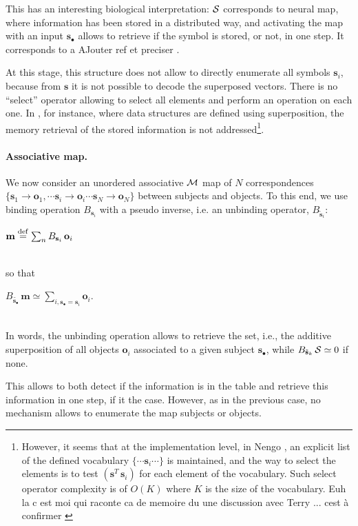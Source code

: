 \documentclass[a4]{article}
\newcommand{\vthierry}[2]{{\color{magenta} #1} \sout{#2}}
\newcommand{\deq}{\stackrel {\rm def}{=}}
\newcommand{\eqline}[1]{~\vspace{0.1cm}\\\centerline{$#1$}\vspace{0.1cm}\\}
\begin{document}
This has an interesting biological interpretation: ${\cal S}$ corresponds to neural map, where information has been stored in a distributed way, and activating the map with an input $\mathbf{s}_\bullet$ allows to retrieve if the symbol is stored, or not, in one step. It corresponds to a \vthierry{AJouter ref et preciser}{}.

At this stage, this structure does not allow to directly enumerate all symbols $\mathbf{s}_i$, because from $\mathbf{s}$ it is not possible to decode the superposed vectors. There is no ``select'' operator allowing to select all elements and perform an operation on each one. In \cite{crawford_biologically_2016}, for instance, where data structures are defined using superposition, the memory retrieval of the stored information is not addressed\footnote{However, it seems that at the implementation level, in Nengo \cite{eliasmith_how_2013}, an explicit list of the defined vocabulary $\{\cdots \mathbf{s}_i \cdots\}$ is maintained, and the way to select the elements is to test $(\mathbf{s}^T \, \mathbf{s}_i)$ for each element of the vocabulary. Such select operator complexity is of $O(K)$ where $K$ is the size of the vocabulary. \vthierry{Euh la c est moi qui raconte ca de memoire du une discussion avec Terry ... cest à confirmer}{}}.

\paragraph{Associative map.} We now consider an unordered associative ${\cal M}$ map of $N$ correspondences $\{\mathbf{s}_1 \rightarrow \mathbf{o}_1, \cdots \mathbf{s}_i \rightarrow \mathbf{o}_i \cdots \mathbf{s}_N \rightarrow \mathbf{o}_N\}$ between subjects and objects. To this end, we use binding operation $B_{\mathbf{s}_i}$ with a pseudo inverse, i.e. an unbinding operator, $B_{\tilde{\mathbf{s}}_i}$:
\eqline{\mathbf{m} \deq \sum_n B_{\mathbf{s}_i} \, \mathbf{o}_i}
so that 
\eqline{B_{\tilde{{\mathbf{s}}_\bullet}} \, \mathbf{m} \simeq \sum_{i, \mathbf{s}_\bullet = \mathbf{s}_i} \mathbf{o}_i.}
In words, the unbinding operation allows to retrieve the set, i.e., the additive superposition of all objects $\mathbf{o}_i$ associated to a given subject $\mathbf{s}_\bullet$, while $B_{\tilde{\mathbf{s}}_k} \, {\cal S} \simeq 0$ if none.

This allows to both detect if the information is in the table and retrieve this information in one step, if it the case. However, as in the previous case, no mechanism allows to enumerate the map subjects or objects.
\end{document}

